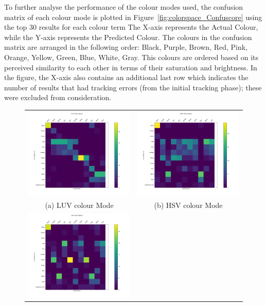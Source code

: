 To further analyse the performance of the colour modes used, the confusion matrix of each colour mode is plotted in Figure~\ref{fig:colorspace_Confuscore} using the top 30 results for each colour term %
The X-axis represents the Actual Colour, while the Y-axis represents the Predicted Colour. The colours in the confusion matrix are arranged in the following order: Black, Purple, Brown, Red, Pink, Orange, Yellow, Green, Blue, White, Gray. This colours are ordered based on its perceived similarity to each other in terms of their saturation and brightness. In the figure, the X-axis also contains an additional last row which indicates the number of results that had tracking errors (from the initial tracking phase); these were excluded from consideration.
\begin{figure}[tb!]
  \centering
  \begin{tabular}{cc}
    \includegraphics[width=0.4\linewidth]{image/retrievalTwo/luvCM.png} &
    \includegraphics[width=0.4\linewidth]{image/retrievalTwo/hsvCM.png} \\
    (a) LUV colour Mode & (b) HSV colour Mode \\
    \includegraphics[width=0.4\linewidth]{image/retrievalTwo/labCM.png} &

\end{tabular}
\end{figure}
